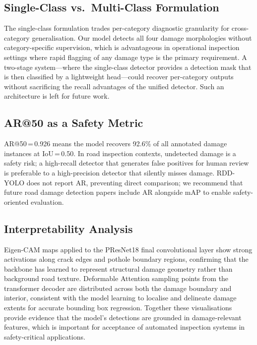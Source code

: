 \documentclass[conference]{IEEEtran}
\begin{document}
\subsection{Single-Class vs.\ Multi-Class Formulation}

The single-class formulation trades per-category diagnostic granularity for
cross-category generalisation.
Our model detects all four damage morphologies without category-specific supervision,
which is advantageous in operational inspection settings where rapid flagging of any
damage type is the primary requirement.
A two-stage system---where the single-class detector provides a detection mask that is
then classified by a lightweight head---could recover per-category outputs without
sacrificing the recall advantages of the unified detector.
Such an architecture is left for future work.

\subsection{AR@50 as a Safety Metric}

AR@50\,=\,0.926 means the model recovers 92.6\% of all annotated damage instances at
IoU\,=\,0.50.
In road inspection contexts, undetected damage is a safety risk; a high-recall
detector that generates false positives for human review is preferable to a
high-precision detector that silently misses damage.
RDD-YOLO does not report AR, preventing direct comparison; we recommend that future
road damage detection papers include AR alongside mAP to enable safety-oriented
evaluation.

\subsection{Interpretability Analysis}

Eigen-CAM maps applied to the PResNet18 final convolutional layer show strong
activations along crack edges and pothole boundary regions, confirming that the
backbone has learned to represent structural damage geometry rather than background
road texture.
Deformable Attention sampling points from the transformer decoder are distributed
across both the damage boundary and interior, consistent with the model learning to
localise and delineate damage extents for accurate bounding box regression.
Together these visualisations provide evidence that the model's detections are grounded
in damage-relevant features, which is important for acceptance of automated inspection
systems in safety-critical applications.
\end{document}
